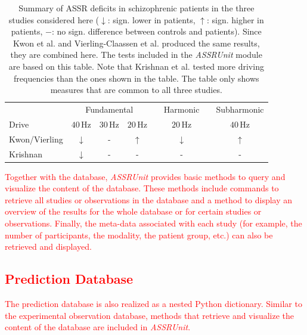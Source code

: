 \documentclass[a4paper,10pt]{article}
\begin{document}
\begin{table}[h!]
\centering
\label{Tab:Experiments} 
\caption{Summary of ASSR deficits in schizophrenic patients in the three studies considered here ($\downarrow$: sign. lower in patients, $\uparrow$: sign. higher in patients, $-$: no sign. difference between controls and patients). 
Since Kwon et al. \cite{Kwon1999} and Vierling-Claassen et al. \cite{Vierling2008}
produced the same results, they are combined here. The tests included in the \textit{ASSRUnit} module are based on this table. Note that Krishnan et al. \cite{Krishnan2009} tested more driving frequencies than the ones shown in the table. 
The table only shows measures that are common to all three studies.}
\begin{tabular}{lccccccc}\toprule
& \multicolumn{3}{c}{Fundamental}& \phantom{a} & Harmonic & \phantom{a} & Subharmonic \\
\cmidrule{2-4} \cmidrule{6-6} \cmidrule{8-8}
Drive& $40$\,Hz  & $30$\,Hz  & $20$\,Hz&  & $20$\,Hz & &$40$\,Hz \\
\midrule 
Kwon/Vierling & $\downarrow$& -& $\uparrow$& &$\downarrow$ & & $\uparrow$\\ \addlinespace

Krishnan & $\downarrow$& -& -& &- & &- \\
\bottomrule
\end{tabular}
\end{table}

\textcolor{red}{
Together with the database, \textit{ASSRUnit} provides basic methods to query and visualize the content of the database. These methods include commands to retrieve all studies or observations in the database and a method
to display an overview of the results for the whole database or for certain studies or observations. Finally, the meta-data associated with each study (for example, the number of participants, the modality, the patient group, etc.)
can also be retrieved and displayed.}


\subsection{\textcolor{red}{Prediction Database}}
\textcolor{red}{The prediction database is also realized as a nested Python dictionary. Similar to the experimental observation database, methods that retrieve and visualize the content of the database are included in \textit{ASSRUnit}.}
\end{document}
